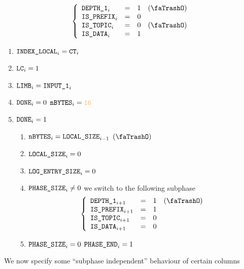 \begin{description}
\begin{enumerate}[resume]
						\[
							\left\{ \begin{array}{lclr}
								\Depth 1_{i}   & = & 1 & (\trash) \\
								\isPrefix_{i}  & = & 0 &          \\
								\isOt_{i}      & = & 0 & (\trash) \\
								\isOd_{i}      & = & 1 &          \\
							\end{array} \right.
						\]
						\Then
						\begin{enumerate}
							\item $\texttt{INDEX\_LOCAL}_{i}=\texttt{CT}_{i}$
							\item $\texttt{LC}_{i}=1$
							\item $\texttt{LIMB}_{i}=\texttt{INPUT\_1} _{i}$
							\item \If $\texttt{DONE}_{i} = 0 $ \Then $\limbsize_{i}=\llarge$
							\item \If $\texttt{DONE}_{i}=1$ \Then 
								\begin{enumerate}
									\item $\texttt{nBYTES}_{i}=\texttt{LOCAL\_SIZE}_{i-1}$ $(\trash)$
									\item $\texttt{LOCAL\_SIZE}_{i}=0$
									\item $\texttt{LOG\_ENTRY\_SIZE}_{i}=0$
									\item \If $\texttt{PHASE\_SIZE}_{i} \neq 0$ \Then we switch to the following subphase
										\[
											\left\{ \begin{array}{lclr}
												\Depth 1_{i + 1}   & = & 1 & (\trash) \\
												\isPrefix_{i + 1}  & = & 1 &          \\
												\isOt_{i + 1}      & = & 0 &          \\
												\isOd_{i + 1}      & = & 0 &          \\
											\end{array} \right.
										\]
									\item \If $\texttt{PHASE\_SIZE}_{i}=0$ \Then $\texttt{PHASE\_END}_{i}=1$
								\end{enumerate}
						\end{enumerate}
				\end{enumerate}
		\end{description}
		We now specify some ``subphase independent'' behaviour of certain columns

